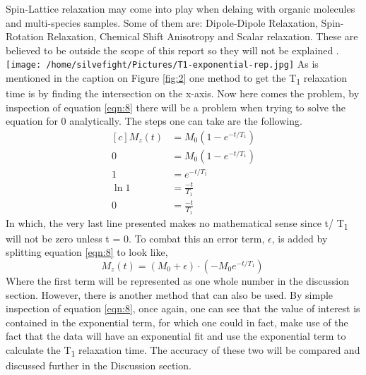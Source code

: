 \documentclass{article}
\begin{document}
{\begin{multicols}{2}
Spin-Lattice relaxation may come into play when delaing with organic molecules 
and multi-species samples. Some of them are: Dipole-Dipole Relaxation, 
Spin-Rotation Relaxation, Chemical Shift Anisotropy and Scalar relaxation. 
These are believed to be outside the scope of this report so they will not be 
explained \cite{ref:1}.
\center
\texttt{[image: /home/silvefight/Pictures/T1-exponential-rep.jpg]}
\label{fig:2}
\justify
As is mentioned in the caption on Figure \ref{fig:2} one method to get the 
T\textsubscript{1} relaxation time is by finding the intersection on the 
x-axis. Now here comes the problem, by inspection of equation \ref{eqn:8} there 
will be a problem when trying to solve the equation for 0 analytically. The 
steps one can take are the following.
\begin{equation*}
\begin{aligned}[c] 
M_z (t) &= M_0 (1-e^{-t/T_1}) \\
0 &= M_0 (1-e^{-t/T_1}) \\
1 &= e^{-t/T_1} \\
\ln{1} &= \frac{-t}{T_1} \\
0 &= \frac{-t}{T_1}
\end{aligned}
\end{equation*}
In which, the very last line presented makes no mathematical sense since t/
T\textsubscript{1} will not be zero unless t = 0. To combat this an error term, 
$\epsilon$, is added by splitting equation \ref{eqn:8} to look like,
\begin{equation}
M_z (t) = (M_0 + \epsilon) \cdot (-M_0 e^{-t/T_1})\
\label{eqn:9}
\end{equation}
Where the first term will be represented as one whole number in the discussion 
section. However, there is another method that can also be used. By simple 
inspection of equation \ref{eqn:8}, once again, one can see that the value of 
interest is contained in the exponential term, for which one could in fact, 
make use of the fact that the data will have an exponential fit and use the 
exponential term to calculate the T\textsubscript{1} relaxation time. The 
accuracy of these two will be compared and discussed further in the Discussion 
section.

\end{multicols}}
\end{document}
